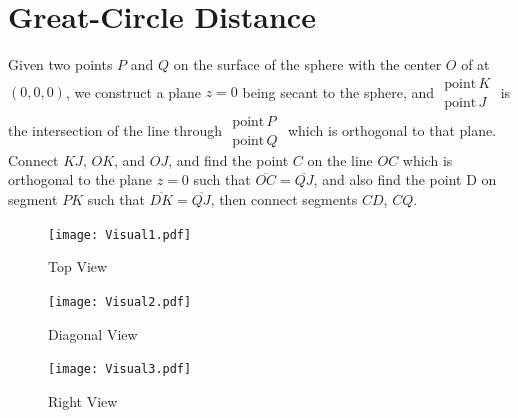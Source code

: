 \documentclass[10pt]{article}
\begin{document}
\section{Great-Circle Distance}
Given two points $P$ and $Q$ on the surface of the sphere with the center $O$ of at $(0,0,0)$, we construct a plane $z=0$ being secant to the sphere, and $\displaystyle{\begin{matrix}\mathrm{point\,}K\\\mathrm{point\,}J\end{matrix}}$ is the intersection of the line through $\displaystyle{\begin{matrix}\mathrm{point\,}P\\\mathrm{point\,}Q\end{matrix}}$ which is orthogonal to that plane. Connect $KJ$, $OK$, and $OJ$, and find the point $C$ on the line $OC$ which is orthogonal to the plane $z=0$ such that $\overline{OC}=\overline{QJ}$, and also find the point D on segment $PK$ such that $\overline{DK}=\overline{QJ}$, then connect segments $CD$, $CQ$.

\begin{figure}[!htbp]
    \centering
    \begin{minipage}[t]{0.275\textwidth}
        \texttt{[image: Visual1.pdf]}
        \caption{Top View}
        \label{fig:great_circle_distance_visual_1}
    \end{minipage}
    \begin{minipage}[t]{0.275\textwidth}
        \texttt{[image: Visual2.pdf]}
        \caption{Diagonal View}
        \label{fig:great_circle_distance_visual_2}
    \end{minipage}
    \begin{minipage}[t]{0.275\textwidth}
        \texttt{[image: Visual3.pdf]}
        \caption{Right View}
        \label{fig:great_circle_distance_visual_3}
    \end{minipage}
\end{figure}
\end{document}
